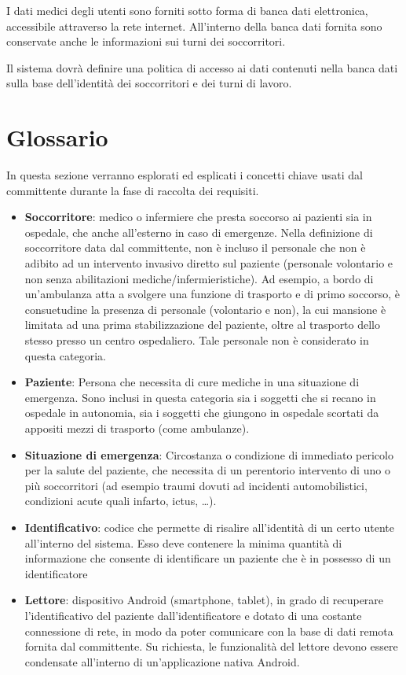 \documentclass[a4paper,12pt]{report}
\begin{document}
I dati medici degli utenti sono forniti sotto forma di banca dati elettronica, accessibile attraverso la rete internet. All'interno della banca dati fornita sono conservate anche le informazioni sui turni dei soccorritori. 

Il sistema dovrà definire una politica di accesso ai dati contenuti nella banca dati sulla base dell'identità dei soccorritori e dei turni di lavoro. 

\section{Glossario} \label{glossary}
In questa sezione verranno esplorati ed esplicati i concetti chiave usati dal committente durante la fase di raccolta dei requisiti. 
\begin{itemize}
	\item \textbf{Soccorritore}: medico o infermiere che presta soccorso ai pazienti sia in ospedale, che anche all'esterno in caso di emergenze. Nella definizione di soccorritore data dal committente, non è incluso il personale che non è adibito ad un intervento invasivo diretto sul paziente (personale volontario e non senza abilitazioni mediche/infermieristiche). Ad esempio, a bordo di un'ambulanza atta a svolgere una funzione di trasporto e di primo soccorso, è consuetudine la presenza di personale (volontario e non), la cui mansione è limitata ad una prima stabilizzazione del paziente, oltre al trasporto dello stesso presso un centro ospedaliero. Tale personale non è considerato in questa categoria.
	\item \textbf{Paziente}: Persona che necessita di cure mediche in una situazione di emergenza. Sono inclusi in questa categoria sia i soggetti che si recano in ospedale in autonomia, sia i soggetti che giungono in ospedale scortati da appositi mezzi di trasporto (come ambulanze).
	\item \textbf{Situazione di emergenza}: Circostanza o condizione di immediato pericolo per la salute del paziente, che necessita di un perentorio intervento di uno o più soccorritori (ad esempio traumi dovuti ad incidenti automobilistici, condizioni acute quali infarto, ictus, \dots).
	\item \textbf{Identificativo}: codice che permette di risalire all'identità di un certo utente all'interno del sistema. Esso deve contenere la minima quantità di informazione che consente di identificare un paziente che è in possesso di un identificatore
	\item \textbf{Lettore}: dispositivo Android (smartphone, tablet), in grado di recuperare l'identificativo del paziente dall'identificatore e dotato di una costante connessione di rete, in modo da poter comunicare con la base di dati remota fornita dal committente. Su richiesta, le funzionalità del lettore devono essere condensate all'interno di un'applicazione nativa Android.

\end{itemize}
\end{document}
